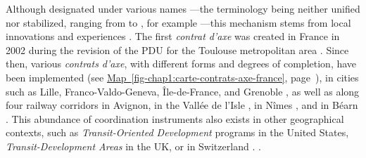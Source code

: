 \begin{refsegment}
{    Although designated under various names \textcolor{blue}{\autocite[10]{cerema_articuler_2015}}—the terminology being neither unified nor stabilized, ranging from  to , for example \textcolor{blue}{\autocite[2]{cerema_articuler_2010}}—this mechanism stems from local innovations and experiences \textcolor{blue}{\autocite[25]{meunier-chabert_contrats_2014}}. The first \textsl{contrat d'axe} was created in France in 2002 during the revision of the \acrfull{PDU} for the Toulouse metropolitan area \textcolor{blue}{\autocite[10]{cerema_articuler_2015}}. Since then, various \textsl{contrats d'axe}, with different forms and degrees of completion, have been implemented (see \hyperref[fig-chap1:carte-contrats-axe-france]{Map~\ref{fig-chap1:carte-contrats-axe-france}}, page~\pageref{fig-chap1:carte-contrats-axe-france}), in cities such as Lille, Franco-Valdo-Geneva, Île-de-France, and Grenoble \textcolor{blue}{\autocite[2]{cerema_articuler_2010}}, as well as along four railway corridors in Avignon, in the Vallée de l'Isle \textcolor{blue}{\autocite[116]{bentayou_contrat_2015}}, in Nîmes \textcolor{blue}{\autocite[15]{haro_ligne_2021}}, and in Béarn \textcolor{blue}{\autocite{fandio_contrat_2023}}. This abundance of coordination instruments also exists in other geographical contexts, such as \textsl{Transit-Oriented Development} programs in the United States, \textsl{Transit-Development Areas} in the UK, or  in Switzerland \textcolor{blue}{\autocites[427]{maulat_coordonner_2014}[25]{walter_coordination_2015}}.
} \textcolor{blue}{\autocite[173]{maulat_coordonner_2014}}.%


\end{refsegment}
